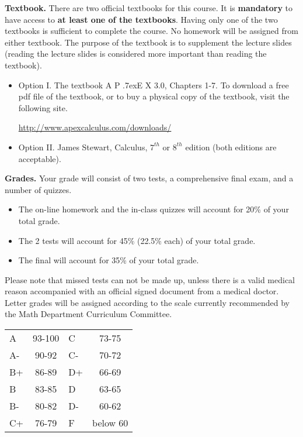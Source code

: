 \documentclass{article}
\newcommand{\apex}{A\kern -1pt \lower -2pt\hbox{P}\kern -4pt \lower .7ex\hbox{E}\kern -1pt X}
\begin{document}
\medskip\noindent \textbf{Textbook. } There are two official textbooks for this course. It is  \textbf{mandatory} to have access to \textbf{at least one of the textbooks}. Having only one of the two textbooks is sufficient to complete the course. No homework will be assigned from either textbook. The purpose of the textbook is to supplement the lecture slides (reading the lecture slides is considered more important than reading the textbook).

\begin{itemize}
\item Option I. The textbook \apex{} 3.0, Chapters 1-7. To download a free pdf file of the textbook, or to buy a physical copy of the textbook, visit the following site.

\url{http://www.apexcalculus.com/downloads/} 
\item Option II. James Stewart, Calculus, $7^{th}$ or $8^{th}$ edition (both editions are acceptable).
\end{itemize}



\medskip
\noindent \textbf{Grades.} Your grade will consist of two tests, a comprehensive final exam, and a number of quizzes. 
\begin{itemize}
\item The on-line homework and the in-class quizzes will account for 20\% of your total grade.
\item The 2 tests will account for 45\% (22.5\% each) of your total grade.
\item The final will account for 35\% of your total grade.
\end{itemize}
Please note that missed tests can not be made up, unless there is a valid medical reason accompanied with an official signed document from a medical doctor. Letter grades will be assigned according to the scale currently recommended by the Math Department Curriculum Committee. 

\begin{center}
\begin{tabular}{lc|lc}
A & 93-100 & C  & 73-75 \\
A-& 90-92  & C- & 70-72 \\
B+& 86-89  & D+ & 66-69 \\
B & 83-85  & D  & 63-65\\
B-& 80-82  & D- & 60-62\\
C+& 76-79  & F  & below 60\\
\end{tabular}

\end{center}
\end{document}
